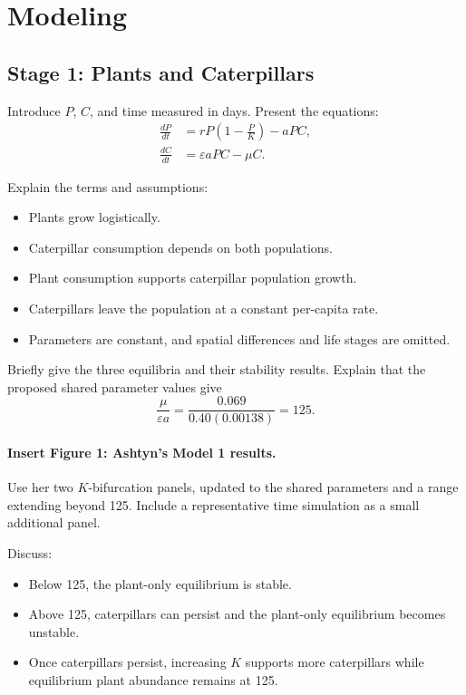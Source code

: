 \documentclass[11pt]{article}
\begin{document}
\section{Modeling}

\subsection{Stage 1: Plants and Caterpillars}

Introduce $P$, $C$, and time measured in days. Present the equations:
\begin{align*}
    \frac{dP}{dt} &= rP\left(1-\frac{P}{K}\right)-aPC, \\
    \frac{dC}{dt} &= \varepsilon aPC-\mu C.
\end{align*}

Explain the terms and assumptions:
\begin{itemize}
    \item Plants grow logistically.
    \item Caterpillar consumption depends on both populations.
    \item Plant consumption supports caterpillar population growth.
    \item Caterpillars leave the population at a constant per-capita rate.
    \item Parameters are constant, and spatial differences and life stages
    are omitted.
\end{itemize}

Briefly give the three equilibria and their stability results. Explain that
the proposed shared parameter values give
\[
    \frac{\mu}{\varepsilon a}
    =\frac{0.069}{0.40(0.00138)}=125.
\]

\paragraph{Insert Figure 1: Ashtyn's Model 1 results.}
Use her two $K$-bifurcation panels, updated to the shared parameters and a
range extending beyond 125. Include a representative time simulation as a
small additional panel.

Discuss:
\begin{itemize}
    \item Below 125, the plant-only equilibrium is stable.
    \item Above 125, caterpillars can persist and the plant-only equilibrium
    becomes unstable.
    \item Once caterpillars persist, increasing $K$ supports more caterpillars
    while equilibrium plant abundance remains at 125.
\end{itemize}
\end{document}
